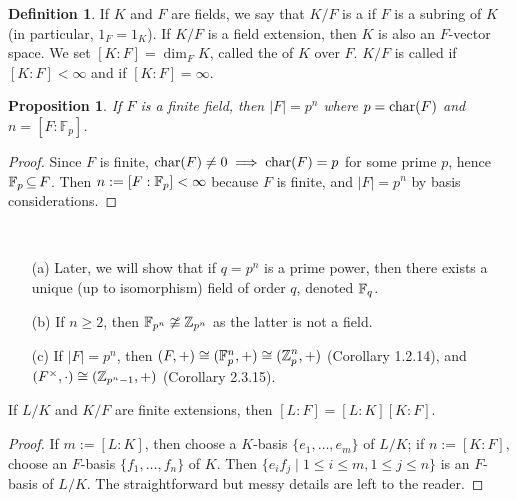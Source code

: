 \documentclass[11pt]{book}
\newcounter{counter}
\newtheorem{proposition}[counter]{Proposition}   \newtheorem{problem}[counter]{Problem}   \newtheorem*{proposition*}{Proposition}   \newtheorem*{lemma*}{Lemma}
\theoremstyle{definition}   \newtheorem{defn}[counter]{Definition} %
\newcommand{\vs}{\vspace{8pt}}   \newcommand{\hs}{\hspace{8pt}}
\numberwithin{counter}{chapter}
\begin{document}
\vs

\begin{defn}
If $K$ and $F$ are fields, we say that $K/F$ is a  if $F$ is a subring of $K$ (in particular, $1_F = 1_K$). If $K/F$ is a field extension, then $K$ is also an $F$-vector space. We set $[K : F] = \dim_F K$, called the  of $K$ over $F$. $K/F$ is called  if $[K : F] < \infty$ and  if $[K : F] = \infty$. 
\end{defn}

\vs

\begin{proposition}
If $F$ is a finite field, then $|F| = p^n$ where $p = \textnormal{char}(F)$ and $n = [F : \mathbb{F}_p]$. 
\end{proposition}

\begin{proof}
Since $F$ is finite, $\textnormal{char}(F) \ne 0 \implies \textnormal{char}(F) = p$ for some prime $p$, hence $\mathbb{F}_p \operatorname{\subseteq} F$. Then $n := [F : \mathbb{F}_p] < \infty$ because $F$ is finite, and $|F| = p^n$ by basis considerations. 
\end{proof}

\vs

\begin{remark}\ 
\begin{enumerate}
\item[(a)] Later, we will show that if $q = p^n$ is a prime power, then there exists a unique (up to isomorphism) field of order $q$, denoted $\mathbb{F}_q$. 
\item[(b)] If $n \geq 2$, then $\mathbb{F}_{p^n} \ncong \operatorname{\mathbb{Z}}_{p^n}$ as the latter is not a field.
\item[(c)] If $|F| = p^n$, then $(F,+) \cong (\mathbb{F}_p^n,+) \cong (\operatorname{\mathbb{Z}}_{p}^n,+)$ (Corollary 1.2.14), and $(F^{\times},\cdot) \cong (\operatorname{\mathbb{Z}}_{p^n-1},+)$ (Corollary 2.3.15). 
\end{enumerate}
\end{remark}

\vs

\begin{lemma}
If $L/K$ and $K/F$ are finite extensions, then $[L : F] = [L : K] [K : F]$.
\end{lemma}

\begin{proof}
If $m := [L : K]$, then choose a $K$-basis $\{e_1,\dots,e_m\}$ of $L/K$; if $n := [K : F]$, choose an $F$-basis $\{f_1,\dots,f_n\}$ of $K$. Then $\{e_i f_j \mid 1 \leq i \leq m, 1 \leq j \leq n\}$ is an $F$-basis of $L/K$. The straightforward but messy details are left to the reader.
\end{proof}
\end{document}
